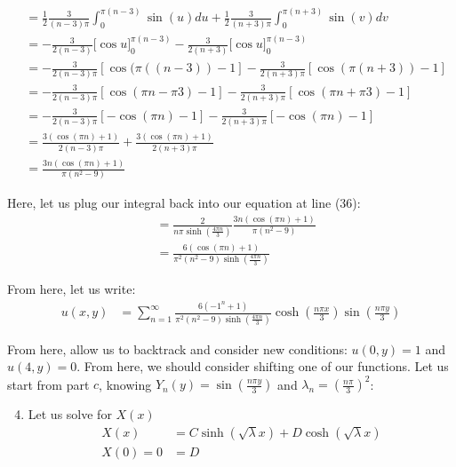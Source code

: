 \documentclass{article}
\begin{document}
\begin{enumerate}
\begin{enumerate}
    \begin{align}
      & =
      \frac{1}{2} \frac{3}{(n - 3) \pi} \int^{\pi(n - 3)}_0 \sin(u) du +
      \frac{1}{2} \frac{3}{(n + 3) \pi} \int^{\pi(n + 3)}_0 \sin(v) dv\\
      & =
      -\frac{3}{2(n - 3)} \bigg[ \cos u \bigg]^{\pi(n - 3)}_0
      -\frac{3}{2(n + 3)} \bigg[ \cos u \bigg]^{\pi(n - 3)}_0\\
      & =
      -\frac{3}{2(n - 3)\pi}
      \left[ \cos(\pi((n - 3)) - 1 \right]
      -\frac{3}{2(n + 3)\pi}
      \left[ \cos(\pi(n + 3)) - 1 \right]\\
      & =
      -\frac{3}{2(n - 3)\pi}
      \left[ \cos(\pi n - \pi 3) - 1 \right]
      -\frac{3}{2(n + 3)\pi}
      \left[ \cos(\pi n + \pi 3) - 1 \right]\\
      & =
      -\frac{3}{2(n - 3)\pi}
      \left[ -\cos(\pi n) - 1 \right]
      -\frac{3}{2(n + 3)\pi}
      \left[ - \cos( \pi n ) - 1 \right]\\
      & =
      \frac{3(\cos(\pi n) + 1)}{2(n - 3)\pi} +
      \frac{3(\cos(\pi n) + 1)}{2(n + 3)\pi}\\
      & =
      \frac{3n(\cos(\pi n) + 1)}{\pi(n^2 - 9)}
    \end{align}

    Here, let us plug our integral back into our equation at line (36):
    \begin{align}
      & =
      \frac{2}{n \pi \sinh(\frac{4 \pi n}{3})}
      \frac{3n(\cos(\pi n) + 1)}{\pi(n^2 - 9)}\\
      & = \frac{6 (\cos (\pi n) + 1)}{\pi^2(n^2 - 9) \sinh(\frac{4 \pi n}{3})}
    \end{align}

    From here, let us write:
    \begin{align}
      u(x, y) & = \sum^\infty_{n = 1} \frac{6 (-1^n + 1)}{\pi^2(n^2 - 9) \sinh(\frac{4 \pi n}{3})} \cosh(\frac{n \pi x}{3}) \sin(\frac{n \pi y}{3})
    \end{align}
  \end{enumerate}

  From here, allow us to backtrack and consider new conditions: $u(0, y) = 1$ and $u(4, y) = 0$. From here, we should consider shifting one of our functions. Let us start from part $c$, knowing
  $Y_n(y) = \sin\left(\frac{n \pi y}{3}\right)$ and $\lambda_n = \left( \frac{n \pi}{3} \right)^2$:

  \begin{enumerate}
    \setcounter{enumii}{3}
    \item Let us solve for $X(x)$
    \begin{align}
      X(x) & = C \sinh(\sqrt \lambda x) + D \cosh(\sqrt \lambda x)\\
      X(0) = 0 & = D
    \end{align}


\end{enumerate}
\end{enumerate}
\end{document}
